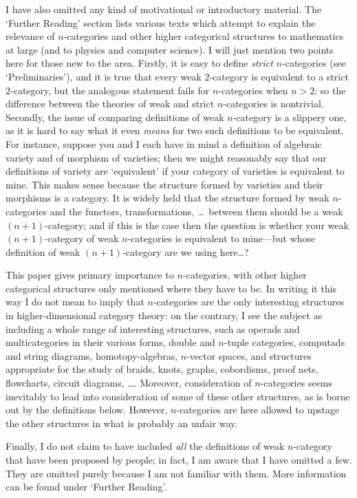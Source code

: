 I have also omitted any kind of motivational or introductory material.  The
`Further Reading' section lists various texts which attempt to explain the
relevance of $n$-categories and other higher categorical structures to
mathematics at large (and to physics and computer science).  I will just
mention two points here for those new to the area.  Firstly, it is easy to
define \emph{strict} $n$-categories (see `Preliminaries'), and it is true
that every weak $2$-category is equivalent to a strict $2$-category, but the
analogous statement fails for $n$-categories when $n>2$: so the difference
between the theories of weak and strict $n$-categories is nontrivial.
Secondly, the issue of comparing definitions of weak $n$-category is a
slippery one, as it is hard to say what it even \emph{means} for two such
definitions to be equivalent.  For instance, suppose you and I each have in
mind a definition of algebraic variety and of morphism of varieties; then we
might reasonably say that our definitions of variety are `equivalent' if your
category of varieties is equivalent to mine.  This makes sense because the
structure formed by varieties and their morphisms is a category.  It is
widely held that the structure formed by weak $n$-categories and the
functors, transformations, \ldots\ between them should be a weak
$(n+1)$-category; and if this is the case then the question is whether your
weak $(n+1)$-category of weak $n$-categories is equivalent to mine---but
whose definition of weak $(n+1)$-category are we using here\ldots?

This paper gives primary importance to $n$-categories, with other higher
categorical structures only mentioned where they have to be.  In writing it
this way I do not mean to imply that $n$-categories are the only interesting
structures in higher-dimensional category theory: on the contrary, I see the
subject as including a whole range of interesting structures, such as operads
and multicategories in their various forms, double and $n$-tuple categories,
computads and string diagrams, homotopy-algebras, $n$-vector spaces, and
structures appropriate for the study of braids, knots, graphs, cobordisms,
proof nets, flowcharts, circuit diagrams, \ldots.  Moreover, consideration of
$n$-categories seems inevitably to lead into consideration of some of these
other structures, as is borne out by the definitions below.  However,
$n$-categories are here allowed to upstage the other structures in what is
probably an unfair way.

Finally, I do not claim to have included \emph{all} the definitions of weak
$n$-category that have been proposed by people; in fact, I am aware that I
have omitted a few.  They are omitted purely because I am not familiar with
them.  More information can be found under `Further Reading'.


